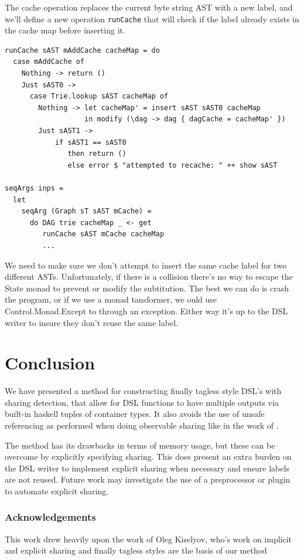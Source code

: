 \documentclass[runningheads]{llncs}
\begin{document}
The cache operation replaces the current byte string AST with a new label, and
we'll define a new operation \texttt{runCache} that will check if
the label already exists in the cache map before inserting it.
\begin{verbatim}
runCache sAST mAddCache cacheMap = do
  case mAddCache of
    Nothing -> return ()
    Just sAST0 ->
      case Trie.lookup sAST cacheMap of
        Nothing -> let cacheMap' = insert sAST sAST0 cacheMap
                   in modify (\dag -> dag { dagCache = cacheMap' })
        Just sAST1 ->
            if sAST1 == sAST0
               then return ()
               else error $ "attempted to recache: " ++ show sAST

seqArgs inps =
  let
    seqArg (Graph sT sAST mCache) =
      do DAG trie cacheMap _ <- get
         runCache sAST mCache cacheMap
         ...
\end{verbatim}
We need to make sure we don't attempt to insert the same cache label for two
different ASTs. Unfortunately, if there is a collision there's no way to escape
the State monad to prevent or modify the subtitution. The best we can do is
crash the program, or if we use a monad tansformer, we ould use
Control.Monad.Except to through an exception. Either way it's up to the DSL
writer to insure they don't reuse the same label.

\section{Conclusion}
We have presented a method for constructing finally tagless style DSL's with
sharing detection, that allow for DSL functions to have multiple outputs via
built-in haskell tuples of container types. It also avoids the use of unsafe
referencing as performed when doing observable sharing like in the work of
\cite{gill:observablesharing}.

The method has its drawbacks in terms of memory usage, but these can be overcome
by explicitly specifying sharing. This does present an extra burden on the DSL
writer to implement explicit sharing when necessary and ensure labels are not
reused. Future work may investigate the use of a preprocessor or plugin to
automate explicit sharing.

\subsubsection{Acknowledgements} This work drew heavily upon the work of Oleg
Kiselyov, who's work on implicit and explicit sharing and finally tagless styles
are the basis of our method

%
%


\end{document}
